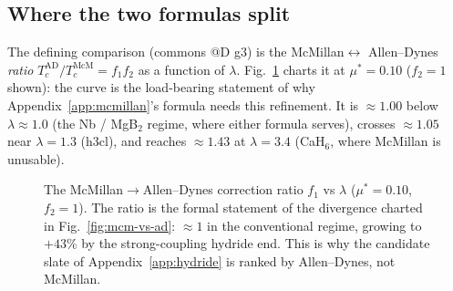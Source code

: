\subsection{Where the two formulas split}
\label{app:ad-split}

The defining comparison (commons @D g3) is the McMillan$\leftrightarrow$
Allen--Dynes \emph{ratio} $T_c^{\text{AD}}/T_c^{\text{McM}}=f_1 f_2$ as a
function of $\lambda$. Fig.~\ref{fig:ad-vs-mcm-ratio} charts it at
$\mu^{*}=0.10$ ($f_2\!=\!1$ shown): the curve is the load-bearing
statement of why Appendix~\ref{app:mcmillan}'s formula needs this
refinement. It is $\approx\!1.00$ below $\lambda\!\approx\!1.0$
(the Nb / MgB$_2$ regime, where either formula serves), crosses
$\approx\!1.05$ near $\lambda\!=\!1.3$ (h3cl), and reaches $\approx\!1.43$
at $\lambda\!=\!3.4$ (CaH$_6$, where McMillan is unusable).

\begin{figure}[h]
\centering
{}
\caption{The McMillan$\to$Allen--Dynes correction ratio $f_1$ vs $\lambda$
($\mu^{*}=0.10$, $f_2{=}1$). The ratio is the formal statement of the
divergence charted in Fig.~\ref{fig:mcm-vs-ad}: $\approx\!1$ in the
conventional regime, growing to $+43$\% by the strong-coupling hydride
end. This is why the candidate slate of Appendix~\ref{app:hydride} is
ranked by Allen--Dynes, not McMillan.}
\label{fig:ad-vs-mcm-ratio}
\end{figure}

